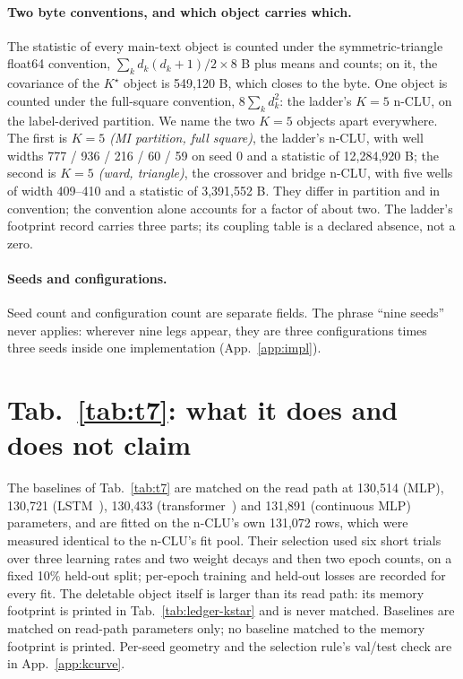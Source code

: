 \documentclass{article} %
\newcommand{\Kstar}{\ensuremath{K^{\star}}}
\begin{document}
\paragraph{Two byte conventions, and which object carries which.} The statistic of every
main-text object is counted under the symmetric-triangle float64 convention,
$\sum_k d_k(d_k+1)/2\times8$ B plus means and counts; on it, the covariance of the $\Kstar$
object is 549,120 B, which closes to the byte. %
One object is counted under the full-square convention, $8\sum_k d_k^2$: the ladder's $K=5$ n-CLU,
on the label-derived partition. We name the two $K=5$ objects apart everywhere. The first is
\emph{$K=5$ (MI partition, full square)}, the ladder's n-CLU, with well widths 777 / 936 / 216 / 60 /
59 on seed 0 and a statistic of 12,284,920 B; the second is \emph{$K=5$ (ward, triangle)}, the
crossover and bridge n-CLU, with five wells of width 409--410 and a statistic of 3,391,552 B.
They differ in partition and in convention; the convention alone accounts for a factor of about two.
The ladder's footprint record carries three parts; its coupling table is a declared absence, not a
zero. %

\paragraph{Seeds and configurations.} Seed count and configuration count are separate fields. The
phrase ``nine seeds'' never applies: wherever nine legs appear, they are three configurations
times three seeds inside one implementation (App.~\ref{app:impl}).

\section{Tab.~\ref{tab:t7}: what it does and does not claim}
\label{app:t7more}
The baselines of Tab.~\ref{tab:t7} are matched on the read path at 130,514 (MLP), 130,721 (LSTM~\citep{hochreiter_long_1997}), %
130,433 (transformer~\citep{vaswani_attention_2023}) and 131,891 (continuous MLP) parameters, and are fitted on the n-CLU's own %
131,072 rows, which were measured identical to the n-CLU's fit pool. Their selection used six short %
trials over three learning rates and two weight decays and then two epoch counts, on a fixed 10\%
held-out split; per-epoch training and held-out losses are recorded for every fit. %
The deletable object itself is larger than its read path: its memory footprint is printed
in Tab.~\ref{tab:ledger-kstar} and is never matched. Baselines are matched on read-path
parameters only; no baseline matched to the memory footprint is printed.
Per-seed geometry and the selection rule's val/test check are in App.~\ref{app:kcurve}.
\end{document}
